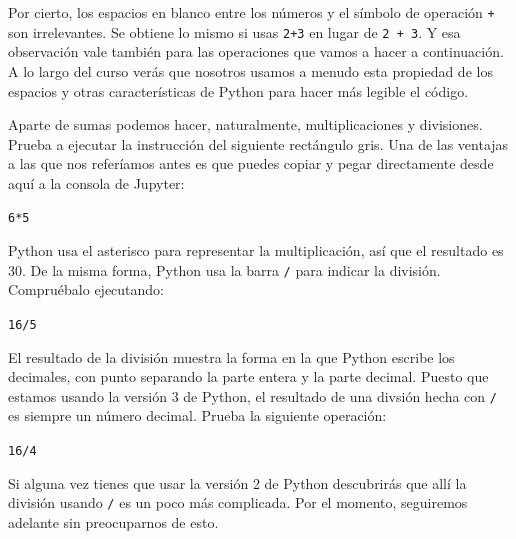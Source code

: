 \documentclass[10pt,a4paper]{article}\usepackage[]{graphicx}\usepackage[]{color}
\makeatletter
\newcommand{\hlnum}[1]{\textcolor[rgb]{0.686,0.059,0.569}{#1}}%
\newcommand{\hlopt}[1]{\textcolor[rgb]{0,0,0}{#1}}%
\newenvironment{kframe}{%
 \def\at@end@of@kframe{}%
 \ifinner\ifhmode%
  \def\at@end@of@kframe{\end{minipage}}%
  \begin{minipage}{\columnwidth}%
 \fi\fi%
 \def\FrameCommand##1{\hskip\@totalleftmargin \hskip-\fboxsep
 \colorbox{shadecolor}{##1}\hskip-\fboxsep
     \hskip-\linewidth \hskip-\@totalleftmargin \hskip\columnwidth}%
 \MakeFramed {\advance\hsize-\width
   \@totalleftmargin\z@ \linewidth\hsize
   \@setminipage}}%
 {\par\unskip\endMakeFramed%
 \at@end@of@kframe}
\newenvironment{knitrout}{}{} %
\newcounter {cont01}
\makeatother
\begin{document}
Por cierto, los espacios en blanco entre los números y el símbolo de operación {\tt +} son irrelevantes. Se obtiene lo mismo si usas {\tt 2+3} en lugar de {\tt 2 + 3}. Y esa observación vale también para las operaciones que vamos a hacer a continuación. A lo largo del curso verás que nosotros usamos a menudo esta propiedad de los espacios y otras características de Python para hacer más legible el código.

Aparte de sumas podemos hacer, naturalmente, multiplicaciones y divisiones. Prueba a ejecutar la instrucción del siguiente rectángulo gris. Una de las ventajas a las que nos referíamos antes es que puedes copiar y pegar directamente desde aquí a la consola de Jupyter:
\begin{knitrout}
\color{fgcolor}\begin{kframe}
\begin{alltt}
\hlnum{6} \hlopt{*} \hlnum{5}
\end{alltt}
\end{kframe}
\end{knitrout}
Python usa el asterisco para representar la multiplicación, así que el resultado es 30. De la misma forma, Python usa la barra {\tt /} para indicar la división. Compruébalo ejecutando:
\begin{knitrout}
\color{fgcolor}\begin{kframe}
\begin{alltt}
\hlnum{16} \hlopt{/} \hlnum{5}
\end{alltt}
\end{kframe}
\end{knitrout}
El resultado de la división muestra la forma en la que Python escribe los decimales, con punto separando la parte entera y la parte decimal. Puesto que estamos usando la versión 3 de Python, el resultado de una divsión hecha con {\tt /} es siempre un número decimal. Prueba la siguiente operación:
\begin{knitrout}
\color{fgcolor}\begin{kframe}
\begin{alltt}
\hlnum{16} \hlopt{/} \hlnum{4}
\end{alltt}
\end{kframe}
\end{knitrout}
Si alguna vez tienes que usar la versión 2 de Python descubrirás que allí la división usando {\tt /} es un poco más complicada. Por el momento, seguiremos adelante sin preocuparnos de esto.
\end{document}
